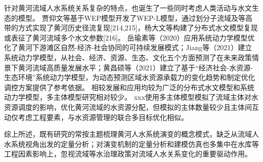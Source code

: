 针对黄河流域人水系统关系复杂的特点，也诞生了一些同时考虑人类活动与水文生态的模型。
贾仰文等基于WEP模型开发了WEP-L模型，通过划分子流域及等高带的方式实现了黄河历史径流复现[214,215]，杨大文等构建了分布式水文模型复现或表征了黄河流域多个水文参数[216]。
岳瑜素等（2020）应用系统动力学模型优化了黄河下游滩区自然-经济-社会协同的可持续发展模式；Jiang等（2021）建立系统动力学模型，从社会、经济、资源、生态、文化五个方面预测了在未来政策情景下黄河流域高质量发展水平；黄昌硕等（2021）建立了基于“经济社会-水资源-生态环境”系统动力学模型，为动态预测区域水资源承载力的变化趋势和制定优化调控方案提供了参考依据。
相较发展和应用均较为广泛的分布式水文模型和系统动力学模型，多主体模型研究相对较少。%
xxx使用多主体模型模拟了流域主体对水资源调度的影响，优化黄河流域的水资源分配，但模拟的主体数量较少且主体间互动仅考虑工程要素，与水资源管理的联合多目标优化相似。%

综上所述，既有研究的常按主题梳理黄河人水系统演变的概念模式，缺乏从流域人水系统视角出发的定量分析；对演变机制的定量分析和建模仿真也多集中在水库等工程因素影响上，忽视流域等水治理政策对流域人水关系变化的重要驱动作用。
